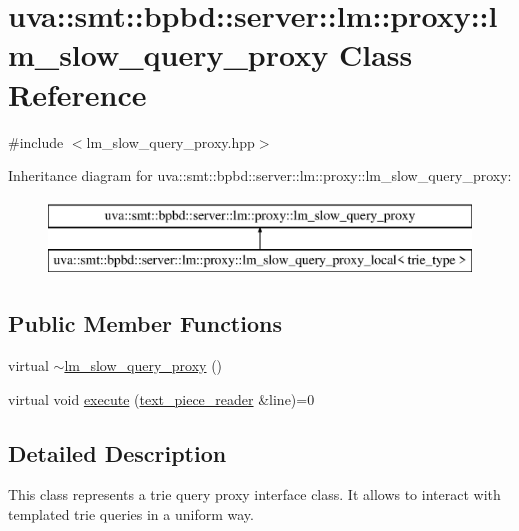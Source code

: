 \hypertarget{classuva_1_1smt_1_1bpbd_1_1server_1_1lm_1_1proxy_1_1lm__slow__query__proxy}{}\section{uva\+:\+:smt\+:\+:bpbd\+:\+:server\+:\+:lm\+:\+:proxy\+:\+:lm\+\_\+slow\+\_\+query\+\_\+proxy Class Reference}
\label{classuva_1_1smt_1_1bpbd_1_1server_1_1lm_1_1proxy_1_1lm__slow__query__proxy}


{\ttfamily \#include $<$lm\+\_\+slow\+\_\+query\+\_\+proxy.\+hpp$>$}

Inheritance diagram for uva\+:\+:smt\+:\+:bpbd\+:\+:server\+:\+:lm\+:\+:proxy\+:\+:lm\+\_\+slow\+\_\+query\+\_\+proxy\+:\begin{figure}[H]
\begin{center}
\leavevmode
\includegraphics[height=2.000000cm]{classuva_1_1smt_1_1bpbd_1_1server_1_1lm_1_1proxy_1_1lm__slow__query__proxy}
\end{center}
\end{figure}
\subsection*{Public Member Functions}
\begin{DoxyCompactItemize}
\item 
virtual \hyperlink{classuva_1_1smt_1_1bpbd_1_1server_1_1lm_1_1proxy_1_1lm__slow__query__proxy_a53222e4917ec99a2c5036dbfbf27564d}{$\sim$lm\+\_\+slow\+\_\+query\+\_\+proxy} ()
\item 
virtual void \hyperlink{classuva_1_1smt_1_1bpbd_1_1server_1_1lm_1_1proxy_1_1lm__slow__query__proxy_aae7c3726774ded484d4757039d28e138}{execute} (\hyperlink{classuva_1_1utils_1_1file_1_1text__piece__reader}{text\+\_\+piece\+\_\+reader} \&line)=0
\end{DoxyCompactItemize}


\subsection{Detailed Description}
This class represents a trie query proxy interface class. It allows to interact with templated trie queries in a uniform way. 


